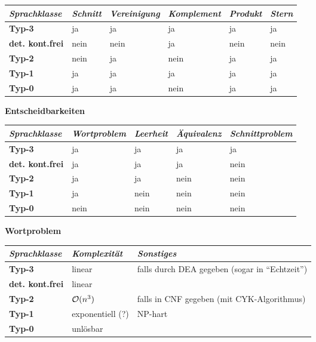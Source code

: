 \begin{tabular}{llllll}
    \toprule

    \emph{Sprachklasse} & \emph{Schnitt} & \emph{Vereinigung} &
    \emph{Komplement} & \emph{Produkt} & \emph{Stern} \\

    \midrule

    \textbf{Typ-3} & ja & ja & ja & ja & ja \\
    \textbf{det. kont.frei} & nein & nein & ja & nein & nein \\
    \textbf{Typ-2} & nein & ja & nein & ja & ja \\
    \textbf{Typ-1} & ja & ja & ja & ja & ja \\
    \textbf{Typ-0} & ja & ja & nein & ja & ja \\

    \bottomrule
\end{tabular}

\vspace{5mm}
\textbf{Entscheidbarkeiten}

\begin{tabular}{lllll}
    \toprule

    \emph{Sprachklasse} & \emph{Wortproblem} & \emph{Leerheit} &
    \emph{Äquivalenz} & \emph{Schnittproblem} \\

    \midrule

    \textbf{Typ-3} & ja & ja & ja & ja \\
    \textbf{det. kont.frei} & ja & ja & ja & nein \\
    \textbf{Typ-2} & ja & ja & nein & nein \\
    \textbf{Typ-1} & ja & nein & nein & nein \\
    \textbf{Typ-0} & nein & nein & nein & nein \\

    \bottomrule
\end{tabular}

\vspace{5mm}
\textbf{Wortproblem}

\begin{tabular}{lll}
    \toprule

    \emph{Sprachklasse} & \emph{Komplexität} & \emph{Sonstiges} \\

    \midrule

    \textbf{Typ-3} & linear &
    falls durch DEA gegeben (sogar in "`Echtzeit"') \\
    \textbf{det. kont.frei} & linear & \\
    \textbf{Typ-2} & $\mathcal{O}(n^3)$ & falls in CNF gegeben (mit CYK-Algorithmus) \\
    \textbf{Typ-1} & exponentiell (?) & NP-hart \\
    \textbf{Typ-0} & unlösbar & \\

    \bottomrule
\end{tabular}

\pagebreak
